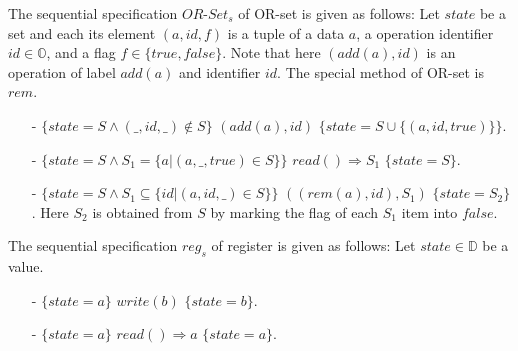 \begin{example}[OR-Set]
\label{definition:sequential specification of or-set}
The sequential specification $\mathit{OR}$-$\mathit{Set}_s$ of OR-set is given as follows: Let $\mathit{state}$ be a set and each its element $(a,\mathit{id},f)$ is a tuple of a data $a$, a operation identifier $\mathit{id} \in \mathbb{O}$, and a flag $f \in \{ \mathit{true},\mathit{false} \}$. Note that here $(add(a),\mathit{id})$ is an operation of label $add(a)$ and identifier $\mathit{id}$. The special method of OR-set is $\mathit{rem}$.
\begin{itemize}
\setlength{\itemsep}{0.5pt}
\item[-] $\{ \mathit{state} = S  \wedge (\_,\mathit{id},\_) \notin S \}$ $(\mathit{add}(a),\mathit{id})$ $\{ \mathit{state} = S \cup \{ (a,\mathit{id},\mathit{true}) \} \}$.
\item[-] $\{ \mathit{state} = S \wedge S_1 = \{ a \vert (a,\_,\mathit{true}) \in S \} \}$ $\mathit{read}() \Rightarrow S_1$ $\{ \mathit{state} = S \}$.
\item[-] $\{ \mathit{state} = S  \wedge S_1 \subseteq \{\mathit{id} \vert (a,\mathit{id},\_) \in S\} \}$ $((rem(a),\mathit{id}),S_1)$ $\{ \mathit{state} = S_2  \}$. Here $S_2$ is obtained from $S$ by marking the flag of each $S_1$ item into $\mathit{false}$. 
\end{itemize}
\end{example}


\begin{example}[Register]
\label{definition:sequential specification of register}
The sequential specification $\mathit{reg}_s$ of register is given as follows: Let $\mathit{state} \in \mathbb{D}$ be a value.
\begin{itemize}
\setlength{\itemsep}{0.5pt}
\item[-] $\{ \mathit{state} = a  \}$ $\mathit{write}(b)$ $\{ \mathit{state} = b \}$.
\item[-] $\{ \mathit{state} = a \}$ $\mathit{read}() \Rightarrow a$ $\{ \mathit{state} = a \}$.
\end{itemize}
\end{example}


